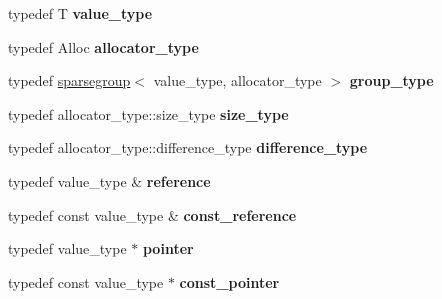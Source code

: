 \begin{DoxyCompactItemize}
\item 
typedef T {\bfseries value\+\_\+type}\hypertarget{classspp___1_1sparsetable_ad899941a3e61cd0c1f33d5820e71c37c}{}\label{classspp___1_1sparsetable_ad899941a3e61cd0c1f33d5820e71c37c}

\item 
typedef Alloc {\bfseries allocator\+\_\+type}\hypertarget{classspp___1_1sparsetable_a70da0808dcfa364153eb20626223893e}{}\label{classspp___1_1sparsetable_a70da0808dcfa364153eb20626223893e}

\item 
typedef \hyperlink{classspp___1_1sparsegroup}{sparsegroup}$<$ value\+\_\+type, allocator\+\_\+type $>$ {\bfseries group\+\_\+type}\hypertarget{classspp___1_1sparsetable_ad25925ffe841d7bdd93136906ade38e6}{}\label{classspp___1_1sparsetable_ad25925ffe841d7bdd93136906ade38e6}

\item 
typedef allocator\+\_\+type\+::size\+\_\+type {\bfseries size\+\_\+type}\hypertarget{classspp___1_1sparsetable_acbc8be2605569b188a333779268e5142}{}\label{classspp___1_1sparsetable_acbc8be2605569b188a333779268e5142}

\item 
typedef allocator\+\_\+type\+::difference\+\_\+type {\bfseries difference\+\_\+type}\hypertarget{classspp___1_1sparsetable_ab4a38edb91cce71391089bfc5a816dc4}{}\label{classspp___1_1sparsetable_ab4a38edb91cce71391089bfc5a816dc4}

\item 
typedef value\+\_\+type \& {\bfseries reference}\hypertarget{classspp___1_1sparsetable_a178dd571389bf438681745c3764a5711}{}\label{classspp___1_1sparsetable_a178dd571389bf438681745c3764a5711}

\item 
typedef const value\+\_\+type \& {\bfseries const\+\_\+reference}\hypertarget{classspp___1_1sparsetable_aea7c4bf125267b30627c2f2f0dfa5c92}{}\label{classspp___1_1sparsetable_aea7c4bf125267b30627c2f2f0dfa5c92}

\item 
typedef value\+\_\+type $\ast$ {\bfseries pointer}\hypertarget{classspp___1_1sparsetable_a403129aee9309caa319eb2fafaa04b08}{}\label{classspp___1_1sparsetable_a403129aee9309caa319eb2fafaa04b08}

\item 
typedef const value\+\_\+type $\ast$ {\bfseries const\+\_\+pointer}\hypertarget{classspp___1_1sparsetable_a2fc6ac05988c4825989e8933310e4529}{}\label{classspp___1_1sparsetable_a2fc6ac05988c4825989e8933310e4529}


\end{DoxyCompactItemize}

